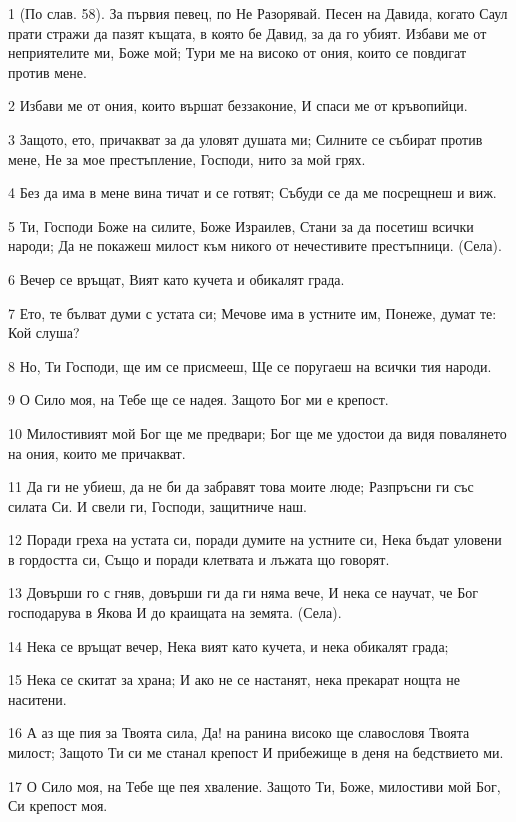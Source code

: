 \par 1 (По слав. 58). За първия певец, по Не Разорявай. Песен на Давида, когато Саул прати стражи да пазят къщата, в която бе Давид, за да го убият. Избави ме от неприятелите ми, Боже мой; Тури ме на високо от ония, които се повдигат против мене.
\par 2 Избави ме от ония, които вършат беззаконие, И спаси ме от кръвопийци.
\par 3 Защото, ето, причакват за да уловят душата ми; Силните се събират против мене, Не за мое престъпление, Господи, нито за мой грях.
\par 4 Без да има в мене вина тичат и се готвят; Събуди се да ме посрещнеш и виж.
\par 5 Ти, Господи Боже на силите, Боже Израилев, Стани за да посетиш всички народи; Да не покажеш милост към никого от нечестивите престъпници. (Села).
\par 6 Вечер се връщат, Вият като кучета и обикалят града.
\par 7 Ето, те бълват думи с устата си; Мечове има в устните им, Понеже, думат те: Кой слуша?
\par 8 Но, Ти Господи, ще им се присмееш, Ще се поругаеш на всички тия народи.
\par 9 О Сило моя, на Тебе ще се надея. Защото Бог ми е крепост.
\par 10 Милостивият мой Бог ще ме предвари; Бог ще ме удостои да видя повалянето на ония, които ме причакват.
\par 11 Да ги не убиеш, да не би да забравят това моите люде; Разпръсни ги със силата Си. И свели ги, Господи, защитниче наш.
\par 12 Поради греха на устата си, поради думите на устните си, Нека бъдат уловени в гордостта си, Също и поради клетвата и лъжата що говорят.
\par 13 Довърши го с гняв, довърши ги да ги няма вече, И нека се научат, че Бог господарува в Якова И до краищата на земята. (Села).
\par 14 Нека се връщат вечер, Нека вият като кучета, и нека обикалят града;
\par 15 Нека се скитат за храна; И ако не се настанят, нека прекарат нощта не наситени.
\par 16 А аз ще пия за Твоята сила, Да! на ранина високо ще славословя Твоята милост; Защото Ти си ме станал крепост И прибежище в деня на бедствието ми.
\par 17 О Сило моя, на Тебе ще пея хваление. Защото Ти, Боже, милостиви мой Бог, Си крепост моя.

